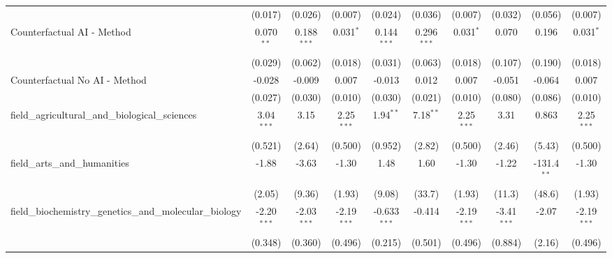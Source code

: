 \begin{tabular}{lccccccccc}
                                                               & (0.017)        & (0.026)        & (0.007)       & (0.024)        & (0.036)        & (0.007)       & (0.032)       & (0.056)       & (0.007)\\   
   Counterfactual AI - Method                                  & 0.070$^{**}$   & 0.188$^{***}$  & 0.031$^{*}$   & 0.144$^{***}$  & 0.296$^{***}$  & 0.031$^{*}$   & 0.070         & 0.196         & 0.031$^{*}$\\   
                                                               & (0.029)        & (0.062)        & (0.018)       & (0.031)        & (0.063)        & (0.018)       & (0.107)       & (0.190)       & (0.018)\\   
   Counterfactual No AI - Method                               & -0.028         & -0.009         & 0.007         & -0.013         & 0.012          & 0.007         & -0.051        & -0.064        & 0.007\\   
                                                               & (0.027)        & (0.030)        & (0.010)       & (0.030)        & (0.021)        & (0.010)       & (0.080)       & (0.086)       & (0.010)\\   
   field\_agricultural\_and\_biological\_sciences              & 3.04$^{***}$   & 3.15           & 2.25$^{***}$  & 1.94$^{**}$    & 7.18$^{**}$    & 2.25$^{***}$  & 3.31          & 0.863         & 2.25$^{***}$\\   
                                                               & (0.521)        & (2.64)         & (0.500)       & (0.952)        & (2.82)         & (0.500)       & (2.46)        & (5.43)        & (0.500)\\   
   field\_arts\_and\_humanities                                & -1.88          & -3.63          & -1.30         & 1.48           & 1.60           & -1.30         & -1.22         & -131.4$^{**}$ & -1.30\\   
                                                               & (2.05)         & (9.36)         & (1.93)        & (9.08)         & (33.7)         & (1.93)        & (11.3)        & (48.6)        & (1.93)\\   
   field\_biochemistry\_genetics\_and\_molecular\_biology      & -2.20$^{***}$  & -2.03$^{***}$  & -2.19$^{***}$ & -0.633$^{***}$ & -0.414         & -2.19$^{***}$ & -3.41$^{***}$ & -2.07         & -2.19$^{***}$\\   
                                                               & (0.348)        & (0.360)        & (0.496)       & (0.215)        & (0.501)        & (0.496)       & (0.884)       & (2.16)        & (0.496)\\   

\end{tabular}
